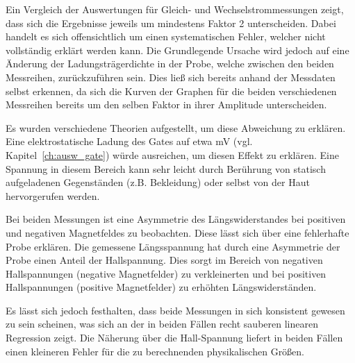 
Ein Vergleich der Auswertungen für Gleich- und Wechselstrommessungen zeigt, dass sich die Ergebnisse jeweils um mindestens Faktor 2 unterscheiden. Dabei handelt es sich offensichtlich um einen systematischen Fehler, welcher nicht vollständig erklärt werden kann. Die Grundlegende Ursache wird jedoch auf eine Änderung der Ladungsträgerdichte in der Probe, welche zwischen den beiden Messreihen, zurückzuführen sein. Dies ließ sich bereits anhand der Messdaten selbst erkennen, da sich die Kurven der Graphen für die beiden verschiedenen Messreihen bereits um den selben Faktor in ihrer Amplitude unterscheiden.

Es wurden verschiedene Theorien aufgestellt, um diese Abweichung zu erklären. Eine elektrostatische Ladung des Gates auf etwa \unit[100]{mV} (vgl. Kapitel~\ref{ch:ausw_gate}) würde ausreichen, um diesen Effekt zu erklären. Eine Spannung in diesem Bereich kann sehr leicht durch Berührung von statisch aufgeladenen Gegenständen (z.B. Bekleidung) oder selbst von der Haut hervorgerufen werden.

Bei beiden Messungen ist eine Asymmetrie des Längswiderstandes bei positiven und negativen Magnetfeldes zu beobachten. Diese lässt sich über eine fehlerhafte Probe erklären. Die gemessene Längsspannung hat durch eine Asymmetrie der Probe einen Anteil der Hallspannung. Dies sorgt im Bereich von negativen Hallspannungen (negative Magnetfelder) zu verkleinerten und bei positiven Hallspannungen (positive Magnetfelder) zu erhöhten Längswiderständen.

Es lässt sich jedoch festhalten, dass beide Messungen in sich konsistent gewesen zu sein scheinen, was sich an der in beiden Fällen recht sauberen linearen Regression zeigt. Die Näherung über die Hall-Spannung liefert in beiden Fällen einen kleineren Fehler für die zu berechnenden physikalischen Größen. 

